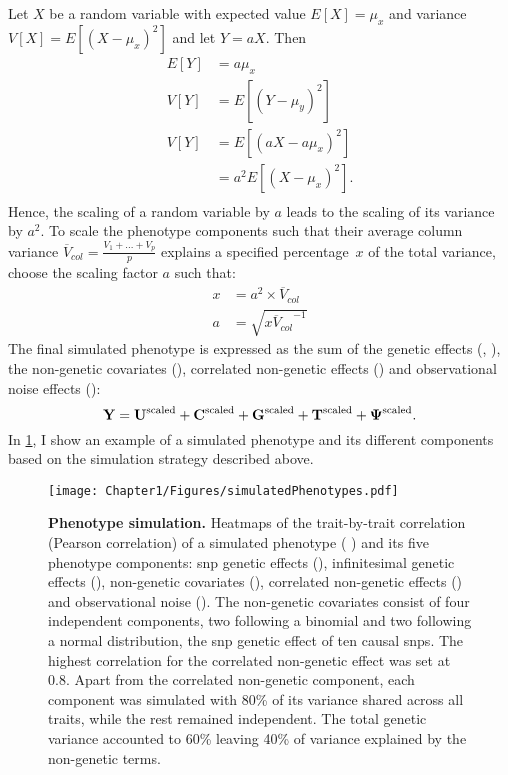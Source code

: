 Let \(X\) be a random variable with expected value \(E[X] = \mu_{x}\) and variance \(V[X] = E[(X - \mu_{x})^2]\) and let  \(Y = aX\). Then
\begin{equation}
\begin{aligned}
E[Y] &= a\mu_{x} \\
V[Y] &= E[(Y - \mu_{y})^2] \\
V[Y] &= E[(aX - a\mu_{x})^2] \\
		&= a^2 E[(X - \mu_{x})^2]. \\
\end{aligned}
\end{equation}
%
Hence, the scaling of a random variable by \(a\) leads to the scaling of its variance by \(a^2\). To scale the phenotype components such that their average column variance \(\overline{V}_{col} = \frac{V_1 + ... + V_p}{p} \) explains a specified percentage~\(x\) of the total variance, choose the scaling factor \(a\) such that: 
\begin{equation}
\begin{aligned}
x  &= a^2 \times \overline{V}_{col} \\
a  &= \sqrt{x{\overline{V}_{col}}^{-1}}
\end{aligned}
\end{equation}
%
The final simulated phenotype   is expressed as the sum of the genetic effects (, ), the non-genetic covariates (), correlated non-genetic effects () and observational noise effects ():
\begin{equation}
\boldsymbol{\mathbf{Y}} = \boldsymbol{\mathbf{U}}^\text{scaled}   + \boldsymbol{\mathbf{C}}^\text{scaled} +  \boldsymbol{\mathbf{G}}^\text{scaled} + \boldsymbol{\mathbf{T}}^\text{scaled} + \boldsymbol{\mathbf{\Psi}}^\text{scaled} .
\end{equation}
%
In \cref{fig:simulation}, I show an example of a simulated phenotype and its different components based on the simulation strategy described above. 
\begin{figure}[h]
	\centering
	\texttt{[image: Chapter1/Figures/simulatedPhenotypes.pdf]}
	\caption[\textbf{Phenotype simulation.}]{\textbf{Phenotype simulation.} Heatmaps of the trait-by-trait correlation (Pearson correlation) of a simulated phenotype ( ) and its five phenotype components: \gls{snp} genetic effects (), infinitesimal genetic effects (), non-genetic covariates (), correlated non-genetic effects () and observational noise (). The non-genetic covariates consist of four independent components, two following a binomial and two following a normal distribution, the \gls{snp} genetic effect of ten causal \glspl{snp}. The highest correlation for the correlated non-genetic effect was set at \num{0.8}. Apart from the correlated non-genetic component, each component was simulated with \num{80}\% of its variance shared across all traits, while the rest remained independent. The total genetic variance accounted to \num{60}\% leaving \num{40}\% of variance explained by the non-genetic terms.}
	\label{fig:simulation}
\end{figure}

